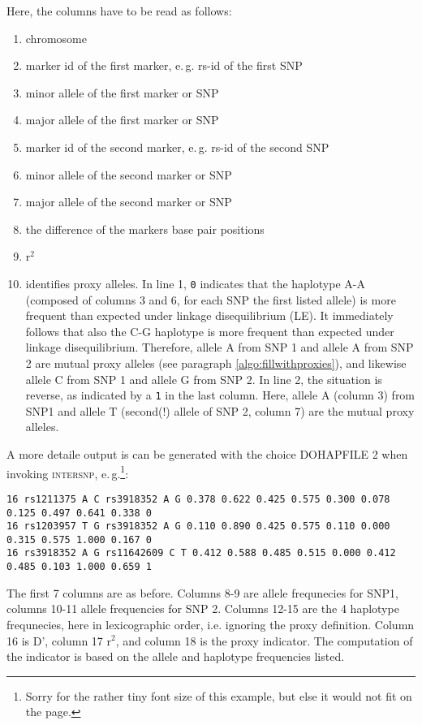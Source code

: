Here, the columns have to be read as follows:
\begin{enumerate}[Column 1)]
 \item chromosome
 \item marker id of the first marker, e.\,g. rs-id of the first SNP
 \item minor allele of the first marker or SNP
 \item major allele of the first marker or SNP
 \item marker id of the second marker, e.\,g. rs-id of the second SNP
 \item minor allele of the second marker or SNP
 \item major allele of the second marker or SNP
 \item the difference of the markers base pair positions
 \item r$^2$
 \item identifies proxy alleles. In line 1, \verb+0+ indicates that the haplotype A-A (composed of columns 3 and 6, for each SNP the first listed allele) is more frequent than expected under linkage disequilibrium (LE). It immediately follows that also the C-G haplotype is more frequent than expected under linkage disequilibrium. Therefore, allele A from SNP 1 and allele A from SNP 2 are mutual proxy alleles (see paragraph \ref{algo:fillwithproxies}), and likewise allele C from SNP 1 and allele G from SNP 2. In line 2, the situation is reverse, as indicated by a \verb+1+ in the last column. Here, allele A (column 3) from SNP1 and allele T (second(!) allele of SNP 2, column 7) are the mutual proxy alleles.
\end{enumerate}

A more detaile output is can be generated with the choice DOHAPFILE 2 when invoking \textsc{intersnp}, e.\,g.\footnote{Sorry for the rather tiny font size of this example, but else it would not fit on the page.}:
\begin{lstlisting}[basicstyle=\scriptsize]
16 rs1211375 A C rs3918352 A G 0.378 0.622 0.425 0.575 0.300 0.078 0.125 0.497 0.641 0.338 0
16 rs1203957 T G rs3918352 A G 0.110 0.890 0.425 0.575 0.110 0.000 0.315 0.575 1.000 0.167 0
16 rs3918352 A G rs11642609 C T 0.412 0.588 0.485 0.515 0.000 0.412 0.485 0.103 1.000 0.659 1
\end{lstlisting}
The first 7 columns are as before. Columns 8-9 are allele frequnecies for SNP1, columns 10-11 allele frequencies for SNP 2. Columns 12-15 are the 4 haplotype frequnecies, here in lexicographic order, i.e. ignoring the proxy definition. Column 16 is D’, column 17 r$^2$, and column 18 is the proxy indicator. The computation of the indicator is based on the allele and haplotype frequencies listed.


